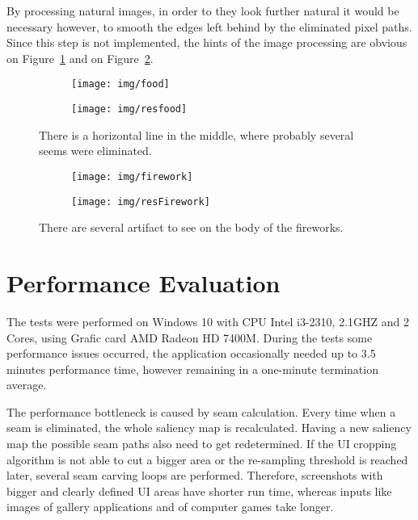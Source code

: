 \documentclass[draft,final]{vutinfth} %
\begin{document}
	By processing natural images, in order to they look further natural it would be necessary however, to smooth the edges left behind by the eliminated pixel paths.
	Since this step is not implemented, the hints of the image processing are obvious on Figure~\ref{fig:nat:food} and on Figure~\ref{fig:nat:fire}.  
	\begin{figure}[h]
		\centering
		\begin{subfigure}[b]{0.45\columnwidth}
			\centering
			\texttt{[image: img/food]}
		\end{subfigure}
		\begin{subfigure}[b]{0.45\columnwidth}
			\centering
			\texttt{[image: img/resfood]}
		\end{subfigure}
		\caption{There is a horizontal line in the middle, where probably several seems were eliminated.}
		\label{fig:nat:food}
	\end{figure}  
	\begin{figure}[h]
		\centering
		\begin{subfigure}[b]{0.45\columnwidth}
			\centering
			\texttt{[image: img/firework]}
		\end{subfigure}
		\begin{subfigure}[b]{0.45\columnwidth}
			\centering
			\texttt{[image: img/resFirework]}
		\end{subfigure}
		\caption{There are several artifact to see on the body of the fireworks.}
		\label{fig:nat:fire}
	\end{figure}    
	
	
	\section{Performance Evaluation}
	The tests were performed on Windows 10 with CPU Intel i3-2310, 2.1GHZ and 2 Cores, using Grafic card AMD Radeon HD 7400M.
	During the tests some performance issues occurred, the application occasionally needed up to 3.5 minutes performance time, however remaining in a one-minute termination average.\par 
	The performance bottleneck is caused by seam calculation.
	Every time when a seam is eliminated, the whole saliency map is recalculated.
	Having a new saliency map the possible seam paths also need to get redetermined.
	If the UI cropping algorithm is not able to cut a bigger area or the re-sampling threshold is reached later, several seam carving loops are performed. 
	Therefore, screenshots with bigger and clearly defined UI areas have shorter run time, whereas inputs like images of gallery applications and of computer games take longer. 
	
\end{document}
